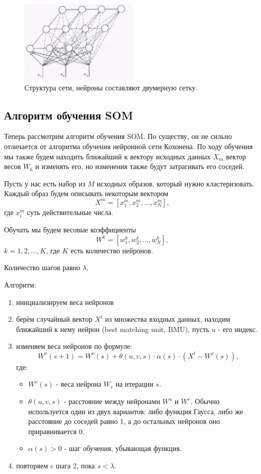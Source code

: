 \documentclass[a4paper,12pt]{article}
\begin{document}
\begin{figure}[h]
  \centering
  \includegraphics[width=0.5\textwidth]{structure.png}
  \caption{Структура сети, нейроны составляют двумерную сетку.}
  \label{img:structure}
\end{figure}

\subsection{Алгоритм обучения SOM}

Теперь рассмотрим алгоритм обучения SOM. По существу, он не сильно отличается от алгоритма обучения нейронной сети Кохонена. По ходу обучения мы также будем находить ближайший к вектору исходных данных $X_m$ вектор весов $W_k$ и изменять его, но изменения также будут затрагивать его соседей.

Пусть у нас есть набор из $M$ исходных образов, который нужно кластеризовать. Каждый образ будем описывать некоторым вектором
\[
  X^m = [x_1^m, x_2^m, ..., x_N^m],
\]
где $x_i^m$ суть действительные числа.

Обучать мы будем весовые коэффициенты
\[
  W^k = [w_1^k, w_2^k, ..., w_N^k],
\]
$k = 1, 2, ..., K$, где $K$ есть количество нейронов.

Количество шагов равно $\lambda$.

Алгоритм:
\begin{enumerate}
  \item инициализируем веса нейронов
  \item берём случайный вектор $X^t$ из множества входных данных, находим ближайший к нему нейрон (best matching unit, BMU), пусть $u$ - его индекс.
  \item изменяем веса нейронов по формуле:
  \[
    W^v(s + 1)=W^v(s)+\theta(u, v, s) \cdot \alpha(s) \cdot (X^t - W^v(s)),
  \]
  где:
  \begin{itemize}
    \setlength\itemsep{0em}
    \item $W^v(s)$ - веса нейрона $W_v$ на итерации $s$.
    \item $\theta(u, v, s)$ - расстояние между нейронами $W^u$ и $W^v$. Обычно используется один из двух вариантов: либо функция Гаусса, либо же расстояние до соседей равно 1, а до остальных нейронов оно приравнивается 0.
    \item $\alpha(s) > 0$ - шаг обучения, убывающая функция.
  \end{itemize}
  \item повторяем c шага 2, пока $s < \lambda$.\cite{algorithm}
\end{enumerate}
\end{document}
